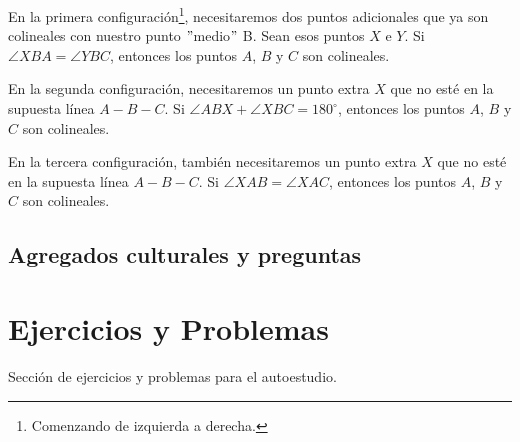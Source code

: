 En la primera configuración\footnote{Comenzando de izquierda a derecha.}, necesitaremos dos puntos adicionales que ya son colineales con nuestro punto \("\)medio\("\) B.
Sean esos puntos $X$ e $Y$.
Si $\angle XBA = \angle YBC$, entonces los puntos $A$, $B$ y $C$ son colineales.

En la segunda configuración, necesitaremos un punto extra $X$ que no esté en la supuesta línea $A - B - C$.
Si $\angle ABX + \angle XBC = 180^\circ$, entonces los puntos $A$, $B$ y $C$ son colineales.

En la tercera configuración, también necesitaremos un punto extra $X$ que no esté en la supuesta línea $A - B - C$.
Si $\angle XAB = \angle XAC$, entonces los puntos $A$, $B$ y $C$ son colineales.%








\subsection{Agregados culturales y preguntas}






\section{Ejercicios y Problemas}
Sección de ejercicios y problemas para el autoestudio.